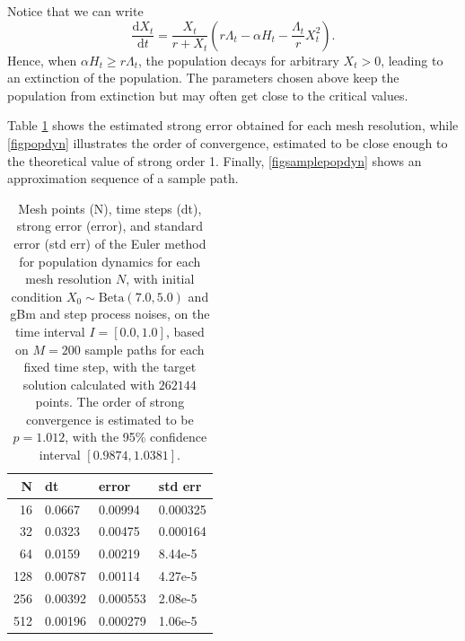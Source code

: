\documentclass[reqno,12pt]{amsart}
\theoremstyle{plain} %
\theoremstyle{definition} %
\begin{document}
Notice that we can write
\[
    \frac{\mathrm{d}X_t}{\mathrm{d}t} = \frac{X_t}{r + X_t} \left(r\Lambda_t - \alpha H_t - \frac{\Lambda_t}{r} X_t^2\right).
\]
Hence, when $\alpha H_t \geq r\Lambda_t$, the population decays for arbitrary $X_t > 0$, leading to an extinction of the population. The parameters chosen above keep the population from extinction but may often get close to the critical values.

Table \ref{tabpopdyn} shows the estimated strong error obtained for each mesh resolution, while \cref{figpopdyn} illustrates the order of convergence, estimated to be close enough to the theoretical value of strong order 1. Finally, \cref{figsamplepopdyn} shows an approximation sequence of a sample path.

\begin{table}
    \begin{tabular}[htb]{|r|l|l|l|}
        \hline N & dt & error & std err \\
        \hline \hline
        16 & 0.0667 & 0.00994 & 0.000325 \\
        32 & 0.0323 & 0.00475 & 0.000164 \\
        64 & 0.0159 & 0.00219 & 8.44e-5 \\
        128 & 0.00787 & 0.00114 & 4.27e-5 \\
        256 & 0.00392 & 0.000553 & 2.08e-5 \\
        512 & 0.00196 & 0.000279 & 1.06e-5 \\
        \hline
    \end{tabular}
    \bigskip

    \caption{Mesh points (N), time steps (dt), strong error (error), and standard error (std err) of the Euler method for population dynamics for each mesh resolution $N$, with initial condition $X_0 \sim \mathrm{Beta}(7.0, 5.0)$ and gBm and step process noises, on the time interval $I = [0.0, 1.0]$, based on $M = 200$ sample paths for each fixed time step, with the target solution calculated with $262144$ points. The order of strong convergence is estimated to be $p = 1.012$, with the 95\% confidence interval $[0.9874, 1.0381]$.}
    \label{tabpopdyn}
\end{table}
\end{document}
